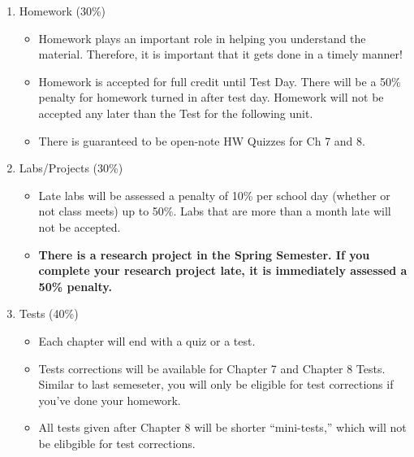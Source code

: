 \documentclass[10pt]{exam}
\begin{document}
\begin{enumerate}
	\item	Homework (30\%)
	\begin{itemize}
		\item 
			Homework plays an important role in helping you understand the material.  Therefore, it is important that it gets done in a timely manner! 
		\item 
			Homework is accepted for full credit until Test Day.  There will be a 50\% penalty for homework turned in after test day.  Homework will not be accepted any later than the Test for the following unit.
    \item 
      There is guaranteed to be open-note HW Quizzes for Ch 7 and 8.  
	\end{itemize}
	\item	Labs/Projects (30\%)
	\begin{itemize}
		\item 
			Late labs will be assessed a penalty of 10\% per school day (whether or not class meets) up to 50\%.  Labs that are more than a month late will not be accepted.
		\item 
		  {\bf There is a research project in the Spring Semester.  If you complete your research project late, it is immediately assessed a 50\% penalty.}
	\end{itemize}
	\item	Tests (40\%)
	\begin{itemize}
		\item	
			Each chapter will end with a quiz or a test.
		\item 
			Tests corrections will be available for Chapter 7 and Chapter 8 Tests.  Similar to last semeseter, you will only be eligible for test corrections if you've done your homework.
    \item 
      All tests given after Chapter 8 will be shorter ``mini-tests,'' which will not be elibgible for test corrections.
	\end{itemize}
	
\end{enumerate}
\end{document}
